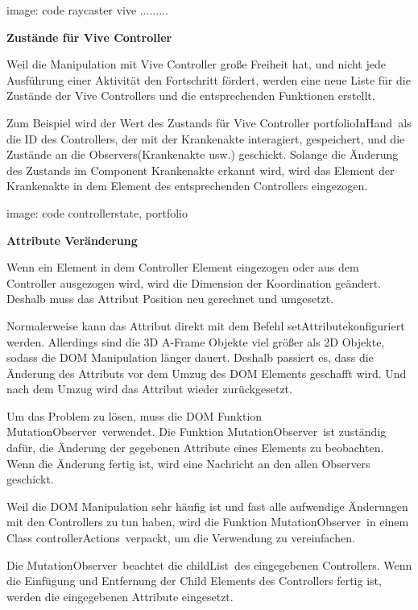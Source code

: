   image: code raycaster vive .........
  
  \textbf{Zustände für Vive Controller}
  
  Weil die Manipulation mit Vive Controller große Freiheit hat, und nicht jede Ausführung einer Aktivität den Fortschritt fördert, werden eine neue Liste für die Zustände der Vive Controllers und die entsprechenden Funktionen erstellt.
  
  Zum Beispiel wird der Wert des Zustands für Vive Controller \glqq portfolioInHand\grqq\ als die ID des Controllers, der mit der Krankenakte interagiert, gespeichert, und die Zustände an die Observers(Krankenakte usw.) geschickt. Solange die Änderung des Zustands im Component Krankenakte erkannt wird, wird das Element der Krankenakte in dem Element des entsprechenden Controllers eingezogen.
  
  image: code controllerstate, portfolio
  
  \textbf{Attribute Veränderung}
  
  Wenn ein Element in dem Controller Element eingezogen oder aus dem Controller ausgezogen wird, wird die Dimension der Koordination geändert. Deshalb muss das Attribut Position neu gerechnet und umgesetzt.
  
  Normalerweise kann das Attribut direkt mit dem Befehl \glqq setAttribute\grqq konfiguriert werden. Allerdings sind die 3D A-Frame Objekte viel größer als 2D Objekte, sodass die DOM Manipulation länger dauert. Deshalb passiert es, dass die Änderung des Attributs vor dem Umzug des DOM Elements geschafft wird. Und nach dem Umzug wird das Attribut wieder zurückgesetzt.
  
  Um das Problem zu lösen, muss die DOM Funktion \glqq MutationObserver\grqq\ verwendet. Die Funktion \glqq MutationObserver\grqq\ ist zuständig dafür, die Änderung der gegebenen Attribute eines Elements zu beobachten. Wenn die Änderung fertig ist, wird eine Nachricht an den allen Observers geschickt.
  
  Weil die DOM Manipulation sehr häufig ist und fast alle aufwendige Änderungen mit den Controllers zu tun haben, wird die Funktion \glqq MutationObserver\grqq\ in einem Class \glqq controllerActions\grqq\ verpackt, um die Verwendung zu vereinfachen.
  
  Die \glqq MutationObserver\grqq\ beachtet die \glqq childList\grqq\ des eingegebenen Controllers. Wenn die Einfügung und Entfernung der Child Elements des Controllers fertig ist, werden die eingegebenen Attribute eingesetzt. 
  
